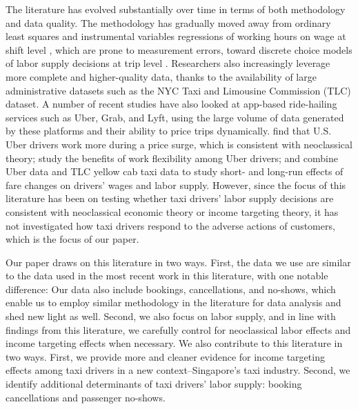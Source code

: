 \documentclass[reviewmode]{restud}
\begin{document}
The literature has evolved substantially over time  in terms of both methodology and data quality. The methodology has gradually moved away from ordinary least squares and instrumental variables regressions of working hours on wage  at shift level \citep{camerer1997labor}, which are prone to measurement errors, toward discrete choice models of labor supply decisions at trip level \citep{farber2005tomorrow,farber2015you,crawford2011new,martin2017quit}. Researchers also increasingly leverage more complete and higher-quality data, thanks to the availability of large administrative datasets such as the NYC Taxi and Limousine Commission (TLC) dataset. A number of recent studies have also looked at app-based ride-hailing services such as Uber, Grab, and Lyft, using the large volume of data generated by these platforms and their ability to price trips dynamically. \citet{chen2015dynamic} find that U.S. Uber drivers work more during a price surge, which is consistent with neoclassical theory; \citet{chen2017value} study the benefits of work flexibility among Uber drivers; and \citet{hall2017labor} combine Uber data and TLC yellow cab taxi data to study short- and long-run effects of fare changes on drivers' wages and labor supply. However, since the focus of this literature has been on testing whether taxi drivers' labor supply decisions are consistent with neoclassical economic theory or income targeting theory, it has not investigated how taxi drivers respond to the adverse actions of customers, which is the focus of our paper.

Our paper draws on this literature in two ways. First, the data we use are similar to the data used in the most recent work in this literature, with one notable difference: Our data also include bookings, cancellations, and no-shows, which enable us to employ similar methodology in the literature for data analysis and shed new light as well. Second, we also focus on labor supply, and in line with findings from this literature, we carefully control for neoclassical labor effects and income targeting effects when necessary. We also contribute to this literature in two ways. First, we provide more and cleaner evidence for income targeting effects among taxi drivers in a new context--Singapore's taxi industry. Second, we identify  additional determinants of taxi drivers' labor supply: booking cancellations and passenger no-shows.

\end{document}
